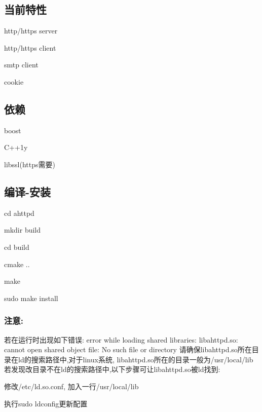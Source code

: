 \subsection*{当前特性}


\begin{DoxyItemize}
\item http/https server
\item http/https client
\item smtp client
\item cookie
\end{DoxyItemize}

\subsection*{依赖}


\begin{DoxyItemize}
\item boost
\item C++1y
\item libssl(https需要)
\end{DoxyItemize}

\subsection*{编译-\/安装}


\begin{DoxyItemize}
\item cd ahttpd
\item mkdir build
\item cd build
\item cmake ..
\item make
\item sudo make install
\end{DoxyItemize}

\subsubsection*{注意\+:}

若在运行时出现如下错误\+: error while loading shared libraries\+: libahttpd.\+so\+: cannot open shared object file\+: No such file or directory 请确保libahttpd.\+so所在目录在ld的搜索路径中,对于linux系统, libahttpd.\+so所在的目录一般为/usr/local/lib 若发现改目录不在ld的搜索路径中,以下步骤可让libahttpd.\+so被ld找到\+:
\begin{DoxyItemize}
\item 修改/etc/ld.so.\+conf, 加入一行/usr/local/lib
\item 执行sudo ldconfig更新配置
\end{DoxyItemize}


